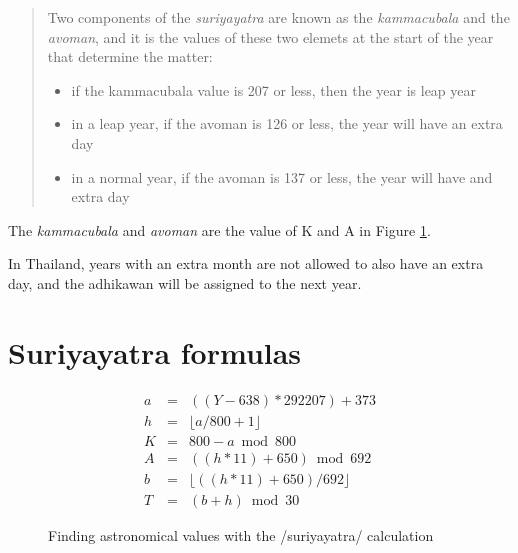 \documentclass[11pt,oneside]{memoir-article}
\begin{document}
\begin{quote}
Two components of the \emph{suriyayatra} are known as the \emph{kammacubala} and
the \emph{avoman}, and it is the values of these two elemets at the start
of the year that determine the matter:

\begin{itemize}
\item if the kammacubala value is 207 or less, then the year is leap year
\item in a leap year, if the avoman is 126 or less, the year will have an
extra day
\item in a normal year, if the avoman is 137 or less, the year will have
and extra day\cite{eade-interpolation}
\end{itemize}
\end{quote}

The \emph{kammacubala} and \emph{avoman} are the value of K and A in Figure
\ref{fig-suriyayatra}.

In Thailand, years with an extra month are not allowed to also have an
extra day, and the adhikawan will be assigned to the next year.

\section{Suriyayatra formulas}
\label{sec-4-4}

\begin{figure}[h]
\caption{Finding astronomical values with the /suriyayatra/ calculation\cite{eade-interpolation}}
\label{fig-suriyayatra}
\begin{eqnarray*}
a & = & ((Y - 638) * 292207) + 373 \\
h & = & \lfloor a/800 + 1 \rfloor \\
K & = & 800 - a \bmod 800 \\
A & = & ((h*11) + 650) \bmod 692 \\
b & = & \lfloor ((h*11) + 650) / 692 \rfloor \\
T & = & (b + h) \bmod 30
\end{eqnarray*}
\end{figure}
\end{document}
